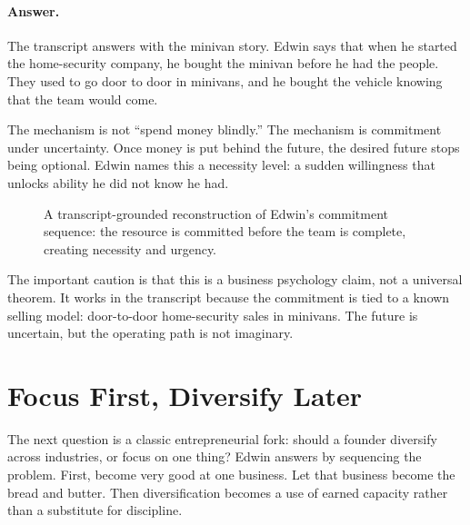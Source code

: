\paragraph{Answer.}
The transcript answers with the minivan story. Edwin says that when he started the home-security company, he bought the minivan before he had the people. They used to go door to door in minivans, and he bought the vehicle knowing that the team would come.

The mechanism is not ``spend money blindly.'' The mechanism is commitment under uncertainty. Once money is put behind the future, the desired future stops being optional. Edwin names this a necessity level: a sudden willingness that unlocks ability he did not know he had.

\begin{figure}
\centering
{}
\caption{A transcript-grounded reconstruction of Edwin's commitment sequence: the resource is committed before the team is complete, creating necessity and urgency.}
\end{figure}

The important caution is that this is a business psychology claim, not a universal theorem. It works in the transcript because the commitment is tied to a known selling model: door-to-door home-security sales in minivans. The future is uncertain, but the operating path is not imaginary.

\section{Focus First, Diversify Later}

The next question is a classic entrepreneurial fork: should a founder diversify across industries, or focus on one thing? Edwin answers by sequencing the problem. First, become very good at one business. Let that business become the bread and butter. Then diversification becomes a use of earned capacity rather than a substitute for discipline.


